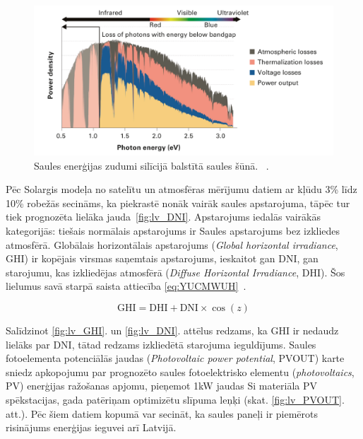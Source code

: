 \begin{figure}[h]
    \centering
    \includegraphics[width=\linewidth]{figures/misc/energyLosses.png}
    \caption{Saules enerģijas zudumi silīcijā balstītā saules šūnā.  ~\cite{Sivaram}.}
    \label{fig:zudumi}
\end{figure}


Pēc Solargis modeļa no satelītu un atmosfēras mērījumu datiem ar kļūdu 3\% līdz 10\% robežās secināms, ka piekrastē nonāk vairāk saules apstarojuma, tāpēc tur tiek prognozēta lielāka jauda~\ref{fig:lv_DNI}. Apstarojums iedalās vairākās kategorijās:
tiešais normālais apstarojums ir Saules apstarojums bez izkliedes atmosfērā.
Globālais horizontālais apstarojums (\textit{Global horizontal irradiance}, GHI) ir kopējais virsmas saņemtais apstarojums, ieskaitot gan DNI, gan starojumu, kas izkliedējas atmosfērā (\textit{Diffuse Horizontal Irradiance}, DHI). Šos lielumus savā starpā saista attiecība \ref{eq:YUCMWUH}~\cite{Sivaram}.

\begin{equation}
\label{eq:YUCMWUH}
\text{GHI}=\text{DHI} + \text{DNI}\times \cos(z)
\end{equation}

Salīdzinot \ref{fig:lv_GHI}. un  \ref{fig:lv_DNI}. attēlus redzams, ka GHI ir nedaudz lielāks par DNI, tātad redzams izkliedētā starojuma ieguldījums. Saules fotoelementa potenciālās jaudas (\textit{Photovoltaic power potential}, PVOUT) karte sniedz apkopojumu par prognozēto saules fotoelektrisko elementu (\textit{photovoltaics}, PV) enerģijas ražošanas apjomu, pieņemot 1kW jaudas Si materiāla PV spēkstacijas, gada patēriņam optimizētu slīpuma leņķi (skat. \ref{fig:lv_PVOUT}. att.). Pēc šiem datiem kopumā var secināt, ka saules paneļi ir piemērots risinājums enerģijas ieguvei arī Latvijā.

